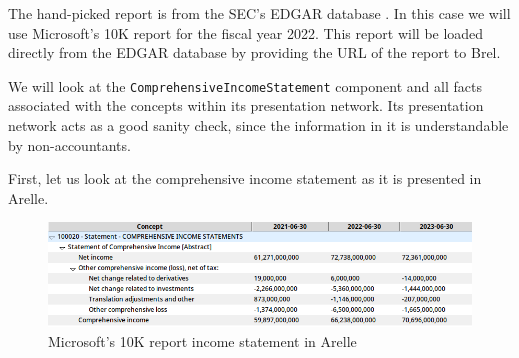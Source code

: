 
The hand-picked report is from the SEC's EDGAR database \cite{sec_edgar}.
In this case we will use Microsoft's 10K report for the fiscal year 2022\cite{microsoft_edgar}.
This report will be loaded directly from the EDGAR database by providing the URL of the report to Brel.

We will look at the \texttt{ComprehensiveIncomeStatement} component and all facts associated with the concepts within its presentation network.
Its presentation network acts as a good sanity check, since the information in it is understandable by non-accountants.

First, let us look at the comprehensive income statement as it is presented in Arelle.

\begin{figure}[H]
  \centering
    \includegraphics[width=1\textwidth]{images/msft_income_statement_arelle.png}
    \caption{Microsoft's 10K report income statement in Arelle}
    \label{fig:msft_income_statement_arelle}
\end{figure}

